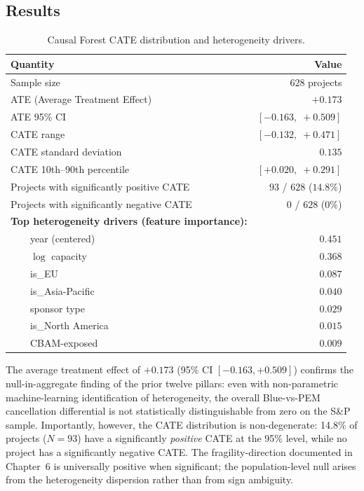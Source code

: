 \documentclass[11pt,a4paper]{article}
\begin{document}
\subsection{Results}

\begin{table}[ht]
\centering
\caption{Causal Forest CATE distribution and heterogeneity drivers.}
\label{tab:ch8-cf}
\begin{tabular}{lr}
\toprule
Quantity & Value \\
\midrule
Sample size & $628$ projects \\
ATE (Average Treatment Effect) & $+0.173$ \\
ATE 95\% CI & $[-0.163,\; +0.509]$ \\
CATE range & $[-0.132,\; +0.471]$ \\
CATE standard deviation & $0.135$ \\
CATE 10th--90th percentile & $[+0.020,\; +0.291]$ \\
Projects with significantly positive CATE & $93$ / $628$ ($14.8\%$) \\
Projects with significantly negative CATE & $0$ / $628$ ($0\%$) \\
\midrule
\textbf{Top heterogeneity drivers (feature importance):} & \\
~~~~year (centered)              & $0.451$ \\
~~~~$\log$ capacity               & $0.368$ \\
~~~~is\_EU                        & $0.087$ \\
~~~~is\_Asia-Pacific              & $0.040$ \\
~~~~sponsor type                  & $0.029$ \\
~~~~is\_North America             & $0.015$ \\
~~~~CBAM-exposed                  & $0.009$ \\
\bottomrule
\end{tabular}
\end{table}

The average treatment effect of $+0.173$ (95\% CI $[-0.163, +0.509]$) confirms the null-in-aggregate finding of the prior twelve pillars: even with non-parametric machine-learning identification of heterogeneity, the overall Blue-vs-PEM cancellation differential is not statistically distinguishable from zero on the S\&P sample. Importantly, however, the CATE distribution is non-degenerate: 14.8\% of projects ($N = 93$) have a significantly \emph{positive} CATE at the 95\% level, while no project has a significantly negative CATE. The fragility-direction documented in Chapter~6 is universally positive when significant; the population-level null arises from the heterogeneity dispersion rather than from sign ambiguity.
\end{document}
